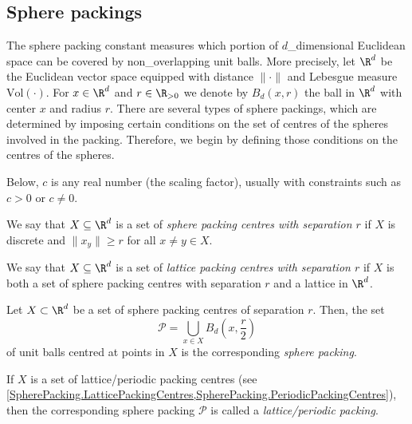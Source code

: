 \subsection{Sphere packings}

The sphere packing constant measures which portion of $d$_dimensional Euclidean space can be covered by non_overlapping unit balls. More precisely, let $\R^d$ be the Euclidean vector space equipped with distance $\|\cdot\|$ and Lebesgue measure $\mathrm{Vol}(\cdot)$. For $x\in\R^d$ and $r\in\R_{>0}$ we denote by $B_d(x,r)$ the ball in $\R^d$ with center $x$ and radius $r$. There are several types of sphere packings, which are determined by imposing certain conditions on the set of centres of the spheres involved in the packing. Therefore, we begin by defining those conditions on the centres of the spheres.

Below, $c$ is any real number (the scaling factor), usually with constraints such as $c > 0$ or $c \neq 0$.

\begin{definition}\label{SpherePacking.SpherePackingCentres}\leanok
  We say that $X \subseteq \R^d$ is a set of \emph{sphere packing centres with separation $r$} if $X$ is discrete and $\|x _ y\| \geq r$ for all $x \neq y\in X$.
\end{definition}

\begin{definition}\label{SpherePacking.LatticePackingCentres}\leanok
  We say that $X \subseteq \R^d$ is a set of \emph{lattice packing centres with separation $r$} if $X$ is both a set of sphere packing centres with separation $r$ and a lattice in $\R^d$.
\end{definition}

\begin{definition}\label{SpherePacking.Packing_of_Centres}\leanok  %
  Let $X\subset \R^d$ be a set of sphere packing centres of separation $r$. Then, the set $$\mathcal{P} = \bigcup_{x \in X} B_d\left(x, \frac{r}{2}\right)$$ of unit balls centred at points in $X$ is the corresponding \emph{sphere packing}.
\end{definition}

\begin{remark}
  If $X$ is a set of lattice/periodic packing centres (see \cref{SpherePacking.LatticePackingCentres,SpherePacking.PeriodicPackingCentres}), then the corresponding sphere packing $\mathcal{P}$ is called a \emph{lattice/periodic packing}.
\end{remark}

